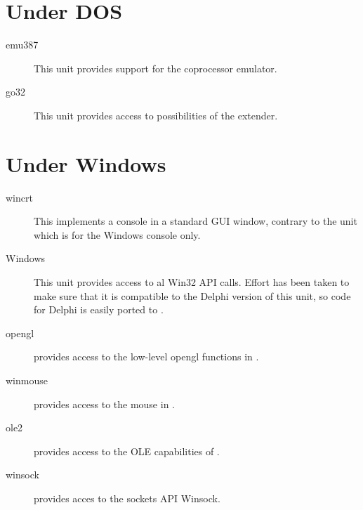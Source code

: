 %
%
\section{Under DOS}
\begin{description}
\item [emu387] This unit provides support for the coprocessor emulator.
\item [go32] This unit provides access to possibilities of the 
\dos extender.
\end{description}

%
%
\section{Under Windows}
\begin{description}
\item[wincrt] This implements a console in a standard GUI window, contrary
to the  unit which is for the Windows console only.
\item[Windows] This unit provides access to al Win32 API calls. Effort has
been taken to make sure that it is compatible to the Delphi version of this
unit, so code for Delphi is easily ported to \fpc.
\item[opengl] provides access to the low-level opengl functions in \windows.
\item[winmouse] provides access to the mouse in \windows.
\item[ole2] provides access to the OLE capabilities of \windows.
\item[winsock] provides acces to the \windows sockets API Winsock.
\end{description}

%
%
